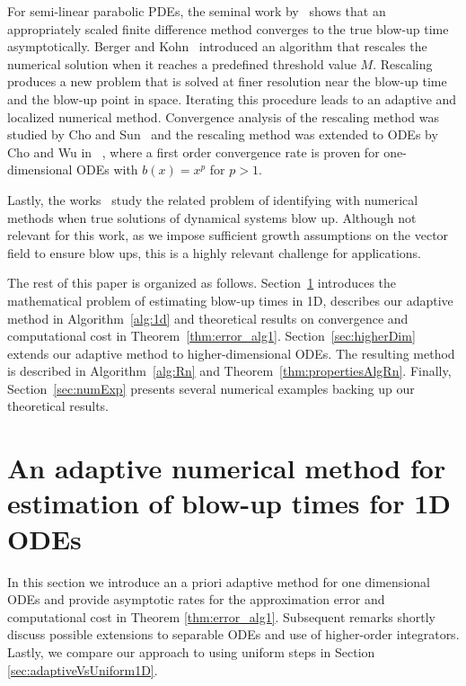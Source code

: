 \documentclass[a4paper, oneside, reqno]{amsart}
\theoremstyle{remark}
\begin{document}
For semi-linear parabolic PDEs, the seminal work by~\cite{Nakagawa1975} shows that an appropriately 
scaled finite difference method converges to the true blow-up time asymptotically. 
Berger and Kohn~\cite{Berger1988} introduced an algorithm that rescales the numerical solution when it reaches a predefined threshold value \(M\). Rescaling produces a new problem that is solved at finer resolution near the blow-up time and the blow-up point in space. Iterating this procedure leads to an adaptive and localized numerical method. 
Convergence analysis of the rescaling method was studied by Cho and Sun~\cite{Cho2025} and the rescaling method was extended to ODEs by Cho and Wu in ~\cite{Cho2024}, where a first order convergence rate is proven for one-dimensional ODEs with $b(x) = x^p$ for $p>1$.  

Lastly, the works~\cite{Matsue2020,Takayasu2017} study the related problem of identifying with numerical methods when true solutions of dynamical systems blow up. Although not relevant for this work, as we impose sufficient growth assumptions on the vector field to ensure blow ups, this is a highly relevant challenge for applications. 

The rest of this paper is organized as follows. Section~\ref{sec:adaptive1D} introduces the 
mathematical problem of estimating blow-up times in 1D, describes our adaptive method in Algorithm~\ref{alg:1d} and theoretical results on convergence and computational cost 
in Theorem~\ref{thm:error_alg1}. Section~\ref{sec:higherDim} extends our adaptive method to 
higher-dimensional ODEs. The resulting method is described in Algorithm~\ref{alg:Rn}
and Theorem~\ref{thm:propertiesAlgRn}. 
Finally, Section~\ref{sec:numExp} presents several numerical examples backing up our theoretical results. 

\section{An adaptive numerical method for estimation of blow-up times for 1D ODEs}
\label{sec:adaptive1D}
In this section we introduce an a priori adaptive method for one dimensional ODEs and provide asymptotic rates for the approximation error and computational cost in Theorem \ref{thm:error_alg1}. Subsequent remarks shortly discuss possible extensions to separable ODEs and use of higher-order integrators. Lastly, we compare our approach to using uniform steps in Section \ref{sec:adaptiveVsUniform1D}.
\end{document}
